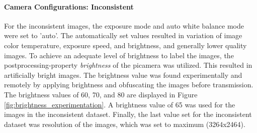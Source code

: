 \paragraph{Camera Configurations: Inconsistent}
For the inconsistent images, the exposure mode and auto white balance mode were set to 'auto'. The automatically set values resulted in variation of image color temperature, exposure speed, and brightness, and generally lower quality images. To achieve an adequate level of brightness to label the images, the postprocessing-property \textit{brightness} of the picamera was utilized. This resulted in artificially bright images. The brightness value was found experimentally and remotely by applying brightness and obfuscating the images before transmission. The brightness values of 60, 70, and 80 are displayed in Figure \ref{fig:brightness_experimentation}. A brightness value of 65 was used for the images in the inconsistent dataset. Finally, the last value set for the inconsistent dataset was resolution of the images, which was set to maximum (3264x2464).

